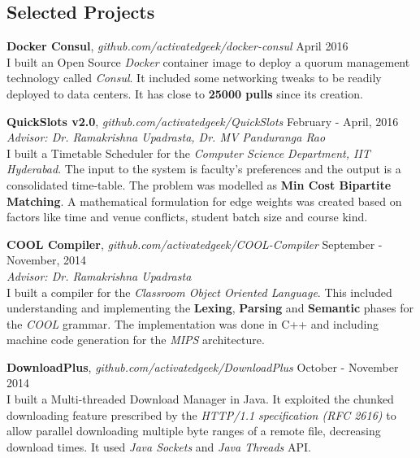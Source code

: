 \documentclass[margin,line]{res}
\begin{document}
\begin{resume}
\section{\sc Selected Projects}

  {\bf Docker Consul}, {\it github.com/activatedgeek/docker-consul} \hfill April 2016 \\
	I built an Open Source {\it Docker} container image to deploy a quorum management technology called {\it Consul}. It included some networking tweaks to be readily deployed to data centers. It has close to {\bf 25000 pulls} since its creation.

  \vspace*{-2.5mm}

  {\bf QuickSlots v2.0}, {\it github.com/activatedgeek/QuickSlots}  \hfill February - April, 2016 \\
  	{\it Advisor: Dr. Ramakrishna Upadrasta, Dr. MV Panduranga Rao} \\
    I built a Timetable Scheduler for the {\it Computer Science Department, IIT Hyderabad}. The input to the system is faculty's preferences and the output is a consolidated time-table. The problem was modelled as {\bf Min Cost Bipartite Matching}. A mathematical formulation for edge weights was created based on factors like time and venue conflicts, student batch size and course kind.

  \vspace*{-2.5mm}

  {\bf COOL Compiler}, {\it github.com/activatedgeek/COOL-Compiler} \hfill September - November, 2014 \\
  	{\it Advisor: Dr. Ramakrishna Upadrasta} \\
  	I built a compiler for the {\it Classroom Object Oriented Language}. This included understanding and implementing the {\bf Lexing}, {\bf Parsing} and {\bf Semantic} phases for the {\it COOL} grammar. The implementation was done in C++ and including machine code generation for the {\it MIPS} architecture.

  \vspace*{-2.5mm}

  {\bf DownloadPlus}, {\it github.com/activatedgeek/DownloadPlus} \hfill October - November 2014 \\
  	I built a Multi-threaded Download Manager in Java. It exploited the chunked downloading feature prescribed by the {\it HTTP/1.1 specification (RFC 2616)} to allow parallel downloading multiple byte ranges of a remote file, decreasing download times. It used {\it Java Sockets} and {\it Java Threads} API.


\end{resume}
\end{document}
